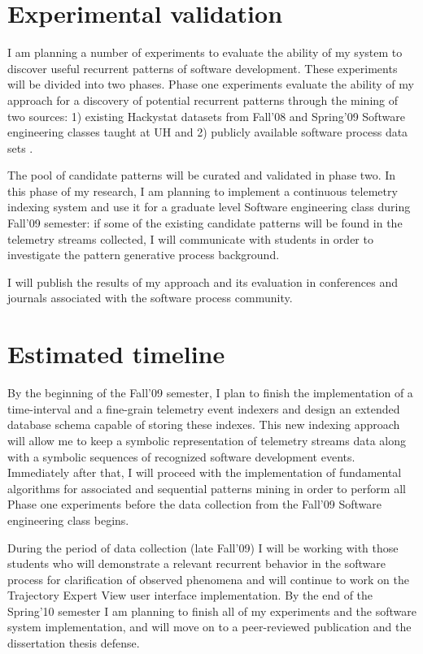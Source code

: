 \documentclass[11pt,oneside]{article}
\begin{document}
\section{Experimental validation}
I am planning a number of experiments to evaluate the ability of my system to discover useful recurrent patterns of software development. These experiments will be divided into two phases. Phase one experiments evaluate the ability of my approach for a discovery of potential recurrent patterns through the mining of two sources: 1) existing Hackystat datasets from Fall'08 and Spring'09 Software engineering classes taught at UH and 2) publicly available software process data sets \cite{Sayyad-Shirabad+Menzies:2005}. 
	
The pool of candidate patterns will be curated and validated in phase two. In this phase of my research, I am planning to implement a continuous telemetry indexing system and use it for a graduate level Software engineering class during Fall'09 semester: if some of the existing candidate patterns will be found in the telemetry streams collected, I will communicate with students in order to investigate the pattern generative process background. 

I will publish the results of my approach and its evaluation in conferences and journals associated with the software process community.

\section{Estimated timeline}
By the beginning of the Fall'09 semester, I plan to finish the implementation of a time-interval and a fine-grain telemetry event indexers and design an extended database schema capable of storing these indexes. This new indexing approach will allow me to keep a symbolic representation of telemetry streams data along with a symbolic sequences of recognized software development events. Immediately after that, I will proceed with the implementation of fundamental algorithms for associated and sequential patterns mining in order to perform all Phase one experiments before the data collection from the Fall'09 Software engineering class begins.

During the period of data collection (late Fall'09) I will be working with those students who will demonstrate a relevant recurrent behavior in the software process for clarification of observed phenomena and will continue to work on the Trajectory Expert View user interface implementation. By the end of the Spring'10 semester I am planning to finish all of my experiments and the software system implementation, and will move on to a peer-reviewed publication and the dissertation thesis defense.



\end{document}
